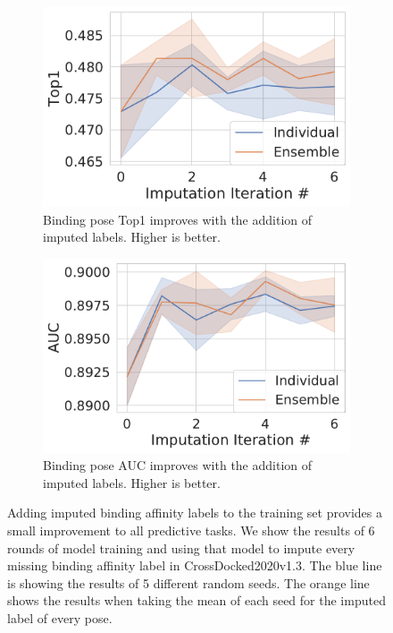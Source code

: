 \documentclass[journal=jmcmar,manuscript=article]{achemso}
\begin{document}
\begin{figure}[tbph]
    \begin{subfigure}[t]{0.48\textwidth}
        \centering
        \includegraphics[width=\linewidth]{figures/InitialImpTop1.pdf}
        \caption{Binding pose Top1 improves with the addition of imputed labels. Higher is better.}
    \end{subfigure}
    \hfill
    \begin{subfigure}[t]{0.48\textwidth}
        \centering
        \includegraphics[width=\linewidth]{figures/InitialImpAUC.pdf}
        \caption{Binding pose AUC improves with the addition of imputed labels. Higher is better.}
    \end{subfigure}
    \caption{Adding imputed binding affinity labels to the training set provides a small improvement to all predictive tasks. We show the results of 6 rounds of model training and using that model to impute every missing binding affinity label in CrossDocked2020v1.3. The blue line is showing the results of 5 different random seeds. The orange line shows the results when taking the mean of each seed for the imputed label of every pose.}
    \label{fig:initialImp}
\end{figure}
\end{document}
